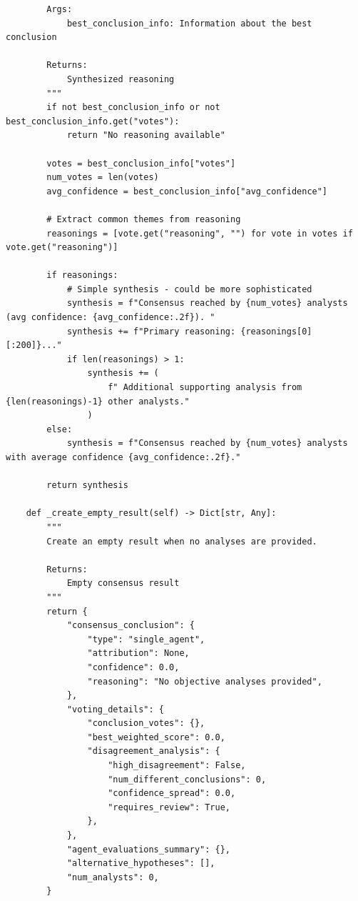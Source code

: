 \documentclass{article}
\begin{document}
\begin{lstlisting}
        Args:
            best_conclusion_info: Information about the best conclusion

        Returns:
            Synthesized reasoning
        """
        if not best_conclusion_info or not best_conclusion_info.get("votes"):
            return "No reasoning available"

        votes = best_conclusion_info["votes"]
        num_votes = len(votes)
        avg_confidence = best_conclusion_info["avg_confidence"]

        # Extract common themes from reasoning
        reasonings = [vote.get("reasoning", "") for vote in votes if vote.get("reasoning")]

        if reasonings:
            # Simple synthesis - could be more sophisticated
            synthesis = f"Consensus reached by {num_votes} analysts (avg confidence: {avg_confidence:.2f}). "
            synthesis += f"Primary reasoning: {reasonings[0][:200]}..."
            if len(reasonings) > 1:
                synthesis += (
                    f" Additional supporting analysis from {len(reasonings)-1} other analysts."
                )
        else:
            synthesis = f"Consensus reached by {num_votes} analysts with average confidence {avg_confidence:.2f}."

        return synthesis

    def _create_empty_result(self) -> Dict[str, Any]:
        """
        Create an empty result when no analyses are provided.

        Returns:
            Empty consensus result
        """
        return {
            "consensus_conclusion": {
                "type": "single_agent",
                "attribution": None,
                "confidence": 0.0,
                "reasoning": "No objective analyses provided",
            },
            "voting_details": {
                "conclusion_votes": {},
                "best_weighted_score": 0.0,
                "disagreement_analysis": {
                    "high_disagreement": False,
                    "num_different_conclusions": 0,
                    "confidence_spread": 0.0,
                    "requires_review": True,
                },
            },
            "agent_evaluations_summary": {},
            "alternative_hypotheses": [],
            "num_analysts": 0,
        }

\end{lstlisting}

\end{document}

